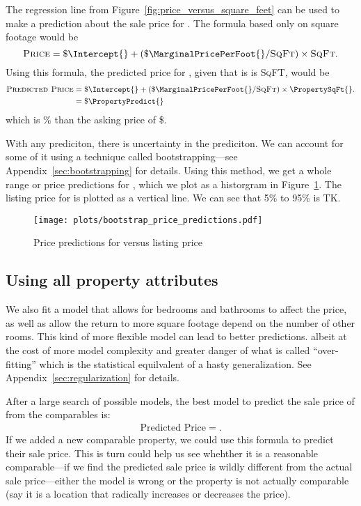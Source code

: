 \documentclass[
12pt, %
letterpaper, %
oneside, %
headinclude,footinclude, %
BCOR5mm, %
]{scrartcl}
\begin{document}
The regression line from Figure~\ref{fig:price_versus_square_feet} can be used to make a prediction about the sale price for \PropertyName{}. 
The formula based only on square footage would be
\begin{equation}
  \textsc{Price} = \$ \Intercept{} + (\$ \MarginalPricePerFoot{}/\textsc{SqFt}) \times \textsc{SqFt}. \nonumber
\end{equation}
Using this formula, the predicted price for \PropertyName{}, given that is is \PropertySqFt{} \textsc{SqFT}, would be
\begin{align}
\textsc{Predicted Price} & = \$ \Intercept{} + (\$ \MarginalPricePerFoot{}/\textsc{SqFt}) \times \PropertySqFt{}. \\ \nonumber
                         & = \$ \PropertyPredict{} \nonumber 
\end{align}
which is \PctDiff{}\% \ComparePredictedToActual{} than the asking price of \$\PropertyPrice{}.

With any prediciton, there is uncertainty in the prediciton.
We can account for some of it using a technique called bootstrapping---see Appendix~\ref{sec:bootstrapping} for details. 
Using this method, we get a whole range or price predictions for \PropertyName{}, which we plot as a historgram in Figure~\ref{fig:bootstrap_price_predictions}.
The listing price for \PropertyName{} is plotted as a vertical line. 
We can see that 5\% to 95\% is TK.

\begin{figure}
\centering
\caption{Price predictions for \PropertyName{} versus listing price} \label{fig:bootstrap_price_predictions}  
\texttt{[image: plots/bootstrap\_price\_predictions.pdf]} 
\end{figure}

\subsection{Using all property attributes}
We also fit a model that allows for bedrooms and bathrooms to affect the price, as well as allow the return to more square footage depend on the number of other rooms.
This kind of more flexible model can lead to better predictions. albeit at the cost of more model complexity and greater danger of what is called ``over-fitting'' which is the statistical equilvalent of a hasty generalization.
See Appendix~\ref{sec:regularization} for details. 

After a large search of possible models, the best model to predict the sale price of \PropertyName{} from the comparables is: 
\begin{align}
\mbox{Predicted Price} = .
\end{align}
If we added a new comparable property, we could use this formula to predict their sale price.
This is turn could help us see whehther it is a reasonable comparable---if we find the predicted sale price is wildly different from the actual sale price---either the model is wrong or the property is not actually comparable (say it is a location that radically increases or decreases the price). 
\end{document}
